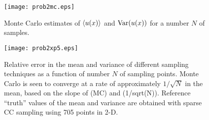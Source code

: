 \documentclass[11pt]{article}
\begin{document}
\begin{figure}[h]
\centering
\texttt{[image: prob2mc.eps]}
\\[2ex]
\caption{Monte Carlo estimates of $\left\langle u(x) \right\rangle$ and $\operatorname{Var}(u(x))$ for a number $N$ of samples.}
\label{fig:prob2_mc}
\end{figure}

\begin{figure}[h]
\centering
\texttt{[image: prob2xp5.eps]}
\\[2ex]
\caption{Relative error in the mean and variance of different sampling techniques as a function of number $N$ of sampling points. Monte Carlo is seen to converge at a rate of approximately $1/\sqrt{N}$ in the mean, based on the slope of (MC) and (1/sqrt(N)). Reference ``truth'' values of the mean and variance are obtained with sparse CC sampling using 705 points in 2-D.}
\label{fig:prob2_xp5}
\end{figure}

\end{document}
